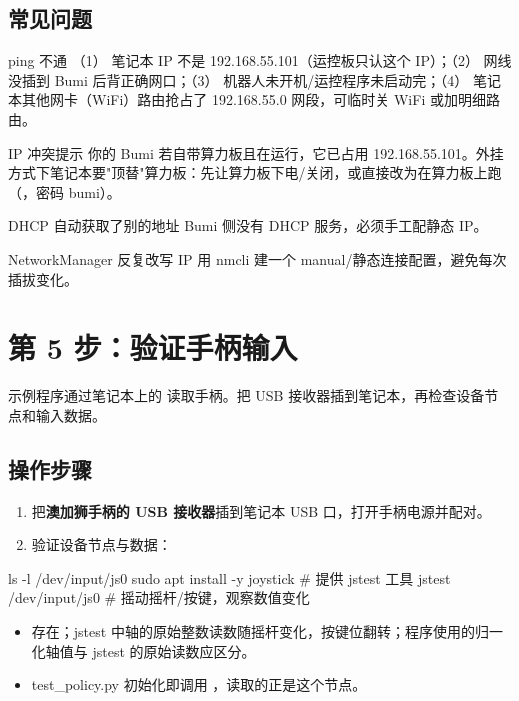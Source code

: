\subsection*{常见问题}
\begin{faq}{ping 不通}
（1） 笔记本 IP 不是 192.168.55.101（运控板只认这个 IP）；（2） 网线没插到 Bumi 后背正确网口；（3） 机器人未开机/运控程序未启动完；（4） 笔记本其他网卡（WiFi）路由抢占了 192.168.55.0 网段，可临时关 WiFi 或加明细路由。
\end{faq}
\begin{faq}{IP 冲突提示}
你的 Bumi 若自带算力板且在运行，它已占用 192.168.55.101。外挂方式下笔记本要"顶替"算力板：先让算力板下电/关闭，或直接改为在算力板上跑（，密码 bumi）。
\end{faq}
\begin{faq}{DHCP 自动获取了别的地址}
Bumi 侧没有 DHCP 服务，必须手工配静态 IP。
\end{faq}
\begin{faq}{NetworkManager 反复改写 IP}
用 nmcli 建一个 manual/静态连接配置，避免每次插拔变化。
\end{faq}


\section{第 5 步：验证手柄输入}
\label{step:5}
示例程序通过笔记本上的  读取手柄。把 USB 接收器插到笔记本，再检查设备节点和输入数据。


\subsection*{操作步骤}
\begin{enumerate}
\item 把\textbf{澳加狮手柄的 USB 接收器}插到笔记本 USB 口，打开手柄电源并配对。
\item 验证设备节点与数据：

\end{enumerate}
\begin{command}
ls -l /dev/input/js0
sudo apt install -y joystick        # 提供 jstest 工具
jstest /dev/input/js0               # 摇动摇杆/按键，观察数值变化
\end{command}

\begin{expected}
\begin{itemize}
\item {} 存在；jstest 中轴的原始整数读数随摇杆变化，按键位翻转；程序使用的归一化轴值与 jstest 的原始读数应区分。
\item test\_policy.py 初始化即调用 ，读取的正是这个节点。

\end{itemize}
\end{expected}
